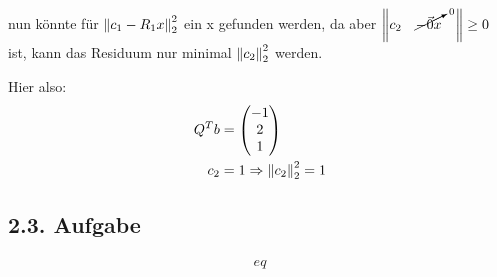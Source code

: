 nun könnte für $\left\lVert c_1 -R_1x\right\rVert_2^2$ ein x gefunden werden, da aber $\left\lVert c_2 \quad\cancelto{0}{-\vec{0}x}\quad\right\rVert \geq 0$ ist, kann das Residuum nur minimal $\left\lVert c_2\right\rVert_2^2$ werden.

Hier also:
\begin{equation}\begin{split}
	Q^Tb &= \begin{pmatrix}
		-1\\2\\1
	\end{pmatrix}\\
	c_2 &= 1 \Rightarrow
	\left\lVert c_2\right\rVert_2^2 = 1
\end{split}\end{equation}



\subsection*{2.3. Aufgabe}
\begin{equation}\begin{split}
	eq
\end{split}\end{equation}

